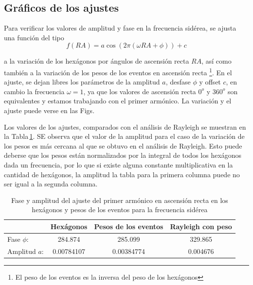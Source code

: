 	\subsection{Gráficos de los ajustes}

Para verificar los valores de amplitud y fase en la frecuencia sidérea, se ajusta una función del tipo 
\begin{equation}
	f(RA) = a\cos{(2\pi(\omega RA + \phi))} +c
\end{equation}

a la variación de los hexágonos por ángulos de ascensión recta $RA$, así como también a la variación de los pesos de los eventos en ascensión recta \footnote{El peso de los eventos es la inversa del peso de los hexágonos}. En el ajuste, se dejan libres los parámetros de la amplitud $a$, desfase $\phi$ y offset $c$, en cambio la frecuencia $\omega=1$, ya que los valores de ascensión recta $0^o$ y $360^o$ son equivalentes y estamos trabajando con el primer armónico. La variación y el ajuste puede verse en las Figs.%

Los valores de los ajustes, comparados con el análisis de Rayleigh se muestran en la Tabla\,\ref{tabla:ajuste_primer_armonico}. SE observa que el valor de la amplitud para el caso de la variación de los pesos es más cercana al que se obtuvo en el análisis de Rayleigh. Esto puede deberse que los pesos están normalizados por la integral de todos los hexágonos dada un frecuencia, por lo que si existe alguna constante multiplicativa en la cantidad de hexágonos, la amplitud la tabla para la primera columna puede no ser igual a la segunda columna.

\begin{table}[H]
\centering
\begin{tabular}{l|c|c|||c}
				& Hexágonos 				& Pesos	de los eventos		& Rayleigh con peso \\ \hline
Fase $\phi$:	& 284.874 	 				& 285.099					&329.865	\\
Amplitud $a$:	& 0.00784107 				&  0.00384774 				&0.004676\\
\end{tabular}
\caption{Fase y amplitud del ajuste del primer armónico en ascensión recta en los hexágonos y  pesos  de los eventos para la frecuencia sidérea}
\label{tabla:ajuste_primer_armonico}
\end{table}



